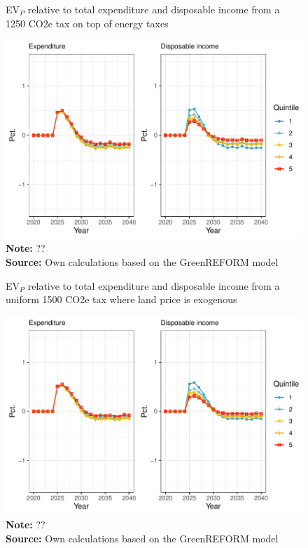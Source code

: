 \begin{figure}[H]
\centering
\caption{EV$_P$ relative to total expenditure and disposable income from a 1250 CO2e tax on top of energy taxes}
\label{tax2_EVP}
\includegraphics[width=.9\textwidth]{Figures/EV_P_tax2.pdf}
\captionsetup{singlelinecheck=off,size=scriptsize}
\setlength{\captionmargin}{10pt}
\caption*{
\textbf{Note:} ??\\
\textbf{Source:} Own calculations based on the GreenREFORM model}
\end{figure}


\begin{figure}[H]
\centering
\caption{EV$_P$ relative to total expenditure and disposable income from a uniform 1500 CO2e tax where land price is exogenous}
\label{tax3_EVP}
\includegraphics[width=.9\textwidth]{Figures/EV_P_tax1.pdf}
\captionsetup{singlelinecheck=off,size=scriptsize}
\setlength{\captionmargin}{10pt}
\caption*{
\textbf{Note:} ??\\
\textbf{Source:} Own calculations based on the GreenREFORM model}
\end{figure}


